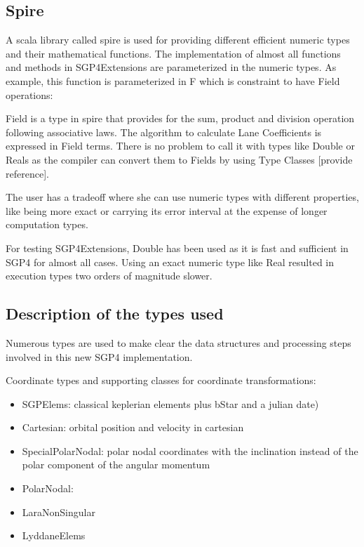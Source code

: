 \documentclass{article}
\begin{document}
\subsection{Spire}
\label{sec:spire}

A scala library called spire is used for providing different efficient numeric types
and their mathematical functions.
The implementation of almost all functions and methods in SGP4Extensions
are parameterized in the numeric types. As example, this function is parameterized
in F which is constraint to have Field operations:

Field is a type in spire that provides for the sum, product and division operation
following associative laws. The algorithm to calculate Lane Coefficients is expressed in Field terms.
There is no problem to call it with types like Double or Reals as the compiler can
convert them to Fields by using Type Classes [{\color{red}provide reference}].

The user has a tradeoff where she can use numeric types with different properties,
like being more exact or carrying its error interval
at the expense of longer computation types.

For testing SGP4Extensions, Double has been used as it is fast and sufficient in SGP4 for almost all cases.
Using an exact numeric type like Real resulted in execution types two orders of magnitude slower.


\subsection{Description of the types used}
\label{sec:typesystem}

Numerous types are used to make clear the data structures and processing
steps involved in this new SGP4 implementation.

Coordinate types and supporting classes for coordinate transformations:
\begin{itemize}
\item SGPElems: classical keplerian elements plus bStar and a julian date)
\item Cartesian: orbital position and velocity in cartesian
\item SpecialPolarNodal: polar nodal coordinates with the inclination instead of the polar component of the angular momentum
\item PolarNodal: \cite{}
\item LaraNonSingular
\item LyddaneElems
\end{itemize}
\end{document}
